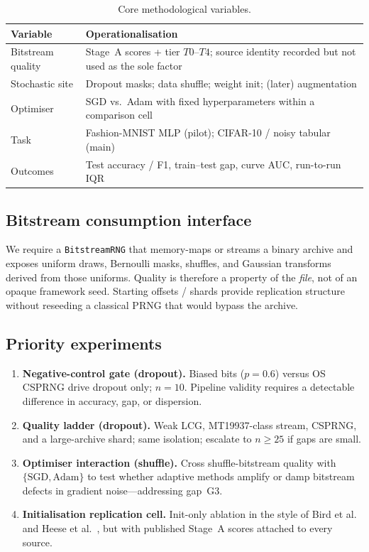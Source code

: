 \begin{table}[t]
\centering
\caption{Core methodological variables.}
\label{tab:vars}
\begin{tabular}{@{}p{3.4cm}p{8.4cm}@{}}
\toprule
\textbf{Variable} & \textbf{Operationalisation} \\
\midrule
Bitstream quality & Stage~A scores + tier $T0$--$T4$; source identity recorded but not used as the sole factor \\
Stochastic site & Dropout masks; data shuffle; weight init; (later) augmentation \\
Optimiser & SGD vs.\ Adam with fixed hyperparameters within a comparison cell \\
Task & Fashion-{MNIST} MLP (pilot); CIFAR-10 / noisy tabular (main) \\
Outcomes & Test accuracy / F1, train--test gap, curve AUC, run-to-run IQR \\
\bottomrule
\end{tabular}
\end{table}

\subsection{Bitstream consumption interface}

We require a \texttt{BitstreamRNG} that memory-maps or streams a binary archive and exposes uniform draws, Bernoulli masks, shuffles, and Gaussian transforms derived from those uniforms.
Quality is therefore a property of the \emph{file}, not of an opaque framework seed.
Starting offsets / shards provide replication structure without reseeding a classical PRNG that would bypass the archive.

\subsection{Priority experiments}

\begin{enumerate}[leftmargin=*]
  \item \textbf{Negative-control gate (dropout).}
  Biased bits ($p=0.6$) versus OS CSPRNG drive dropout only; $n=10$.
  Pipeline validity requires a detectable difference in accuracy, gap, or dispersion.

  \item \textbf{Quality ladder (dropout).}
  Weak LCG, MT19937-class stream, CSPRNG, and a large-archive shard; same isolation; escalate to $n\geq 25$ if gaps are small.

  \item \textbf{Optimiser interaction (shuffle).}
  Cross shuffle-bitstream quality with $\{\mathrm{SGD},\mathrm{Adam}\}$ to test whether adaptive methods amplify or damp bitstream defects in gradient noise---addressing gap~G3.

  \item \textbf{Initialisation replication cell.}
  Init-only ablation in the style of Bird et al.~\cite{bird2019softcomputing} and Heese et al.~\cite{heese2024biased}, but with published Stage~A scores attached to every source.
\end{enumerate}

